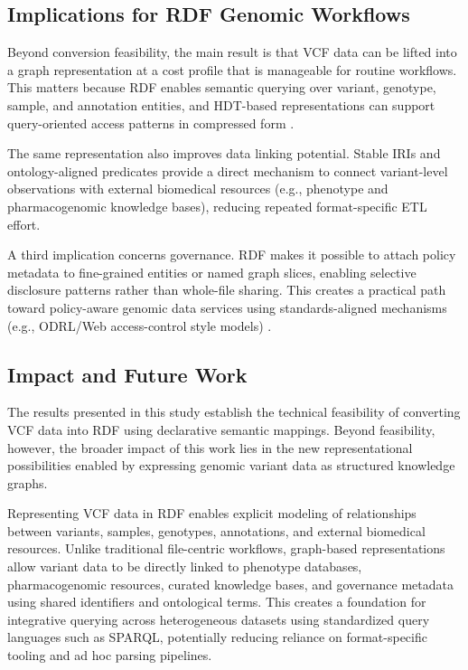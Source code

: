 \documentclass[unnumsec,webpdf,contemporary,large]{oup-authoring-template}
\begin{document}
\subsection{Implications for RDF Genomic Workflows}\label{subsec4.3}
Beyond conversion feasibility, the main result is that VCF data can be lifted into a graph representation at a cost profile that is manageable for routine workflows. This matters because RDF enables semantic querying over variant, genotype, sample, and annotation entities, and HDT-based representations can support query-oriented access patterns in compressed form \cite{Taelman2018Comunica}.

The same representation also improves data linking potential. Stable IRIs and ontology-aligned predicates provide a direct mechanism to connect variant-level observations with external biomedical resources (e.g., phenotype and pharmacogenomic knowledge bases), reducing repeated format-specific ETL effort.

A third implication concerns governance. RDF makes it possible to attach policy metadata to fine-grained entities or named graph slices, enabling selective disclosure patterns rather than whole-file sharing. This creates a practical path toward policy-aware genomic data services using standards-aligned mechanisms (e.g., ODRL/Web access-control style models) \cite{acl_2021}.


\subsection{Impact and Future Work}\label{subsec4.5}

The results presented in this study establish the technical feasibility of converting VCF data into RDF using declarative semantic mappings. 
Beyond feasibility, however, the broader impact of this work lies in the new representational possibilities enabled by expressing genomic variant data as structured knowledge graphs.

Representing VCF data in RDF enables explicit modeling of relationships between variants, samples, genotypes, annotations, and external biomedical resources. 
Unlike traditional file-centric workflows, graph-based representations allow variant data to be directly linked to phenotype databases, pharmacogenomic resources, curated knowledge bases, and governance metadata using shared identifiers and ontological terms. 
This creates a foundation for integrative querying across heterogeneous datasets using standardized query languages such as SPARQL, potentially reducing reliance on format-specific tooling and ad hoc parsing pipelines.
\end{document}
